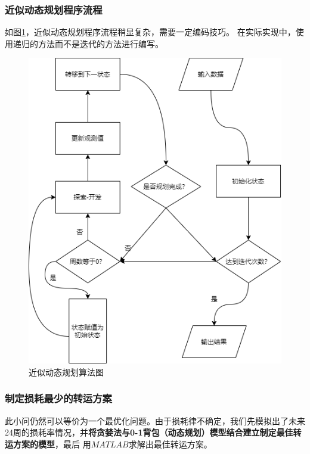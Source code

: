 \documentclass{cumcmthesis}
\begin{document}
\subsubsection*{近似动态规划程序流程}
如图\ref{fig:6}，近似动态规划程序流程稍显复杂，需要一定编码技巧。
在实际实现中，使用递归的方法而不是迭代的方法进行编写。
\begin{figure}[H]
    \centering
    \includegraphics[scale = 0.5]{GH.png}
    \centering
    \caption{近似动态规划算法图} \label{fig:6}
\end{figure}


\subsubsection{制定损耗最少的转运方案}
此小问仍然可以等价为一个最优化问题。由于损耗律不确定，我们先模拟出了未来24周的损耗率情况，并\textbf{将贪婪法与0-1背包（动态规划）模型结合建立制定最佳转运方案的模型}，最后
用$MATLAB$求解出最佳转运方案。
\end{document}
